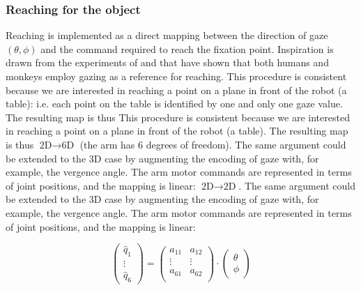 
\subsubsection*{Reaching for the object}

Reaching is implemented as a direct mapping between the direction of gaze 
$(\theta,\phi)$ and the command required to reach the fixation point. 
\ifrev
Inspiration is drawn from the experiments of \cite{flanders-daghestani-berthoz-1999} 
and \cite{pouget-ducom-torri-bavelier-2002} that have shown that both
humans and monkeys employ gazing as a reference for reaching.
\fi
\ifrev
This procedure is consistent because we are interested in reaching a 
point on a plane in front of the robot (a table): i.e. each point on the
table is identified by one and only one gaze value. The resulting map is thus
\else
This procedure is consistent because we are interested in reaching a 
point on a plane in front of the robot (a table). The resulting map is thus
\fi
\ifrev
$\textrm{2D} \to \textrm{6D}$ (the arm has 6 degrees of freedom). 
The same argument could be extended to the 3D
case by augmenting the encoding of gaze with, for example, the vergence angle. 
The arm motor commands are represented in terms of joint positions,
and the mapping is linear:
\else
$\textrm{2D} \to \textrm{2D}$. The same argument could be extended to the 3D
case by augmenting the encoding of gaze with, for example, the vergence angle. 
The arm motor commands are represented in terms of joint positions,
and the mapping is linear:
\fi

\begin{equation} \label{eq:reachmap}
\left( \begin{array}{c}
\hat{q}_1\\
\vdots\\
\hat{q}_6
\end{array}
\right) = 
\left( \begin{array}{cc}
a_{11} & a_{12} \\
\vdots & \vdots \\
a_{61} & a_{62} \\
\end{array}
\right) 
\cdot 
\left( \begin{array}{c}
\theta \\
\phi
\end{array}
\right)
\end{equation}

